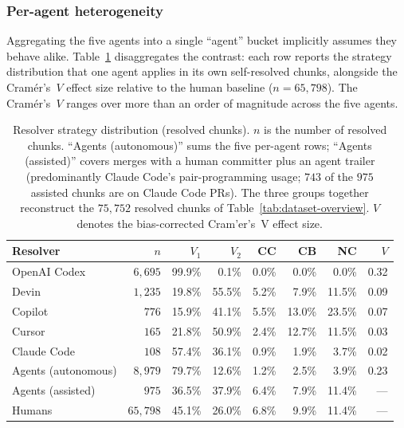 \documentclass[sigconf,anonymous]{acmart}
\begin{document}
\subsubsection{Per-agent heterogeneity}
\label{sec:rq2-heterogeneity}

Aggregating the five agents into a single ``agent'' bucket implicitly assumes they behave alike. Table~\ref{tab:per-agent-vs-human} disaggregates the contrast: each row reports the strategy distribution that one agent applies in its own self-resolved chunks, alongside the Cram\'{e}r's~$V$ effect size relative to the human baseline ($n=65{,}798$). The Cram\'{e}r's~$V$ ranges over more than an order of magnitude across the five agents.

\begin{table}
  \caption{Resolver strategy distribution (resolved chunks). $n$ is the number of resolved chunks. ``Agents (autonomous)'' sums the five per-agent rows; ``Agents (assisted)'' covers merges with a human committer plus an agent trailer (predominantly Claude Code's pair-programming usage; $743$ of the $975$ assisted chunks are on Claude Code PRs). The three groups together reconstruct the $75{,}752$ resolved chunks of Table~\ref{tab:dataset-overview}. $V$ denotes the bias-corrected Cram'{e}r's~V effect size.}
  \label{tab:per-agent-vs-human}
  \small\setlength{\tabcolsep}{3.5pt}
  \begin{tabular}{lrrrrrrr}
    \toprule
    Resolver & $n$ & $V_1$ & $V_2$ & CC & CB & NC & $V$ \\
    \midrule
    OpenAI Codex & $6{,}695$ & 99.9\% &  0.1\% &  0.0\% &  0.0\% &  0.0\% & 0.32 \\
    Devin        & $1{,}235$ & 19.8\% & 55.5\% &  5.2\% &  7.9\% & 11.5\% & 0.09 \\
    Copilot      & $776$     & 15.9\% & 41.1\% &  5.5\% & 13.0\% & 23.5\% & 0.07 \\
    Cursor       & $165$     & 21.8\% & 50.9\% &  2.4\% & 12.7\% & 11.5\% & 0.03 \\
    Claude Code  & $108$     & 57.4\% & 36.1\% &  0.9\% &  1.9\% &  3.7\% & 0.02 \\
    \midrule
    Agents (autonomous) & $8{,}979$ & 79.7\% & 12.6\% &  1.2\% &  2.5\% &  3.9\% & 0.23 \\
    Agents (assisted)   & $975$    & 36.5\% & 37.9\% &  6.4\% &  7.9\% & 11.4\% & --- \\
    \midrule
    Humans       & $65{,}798$ & 45.1\% & 26.0\% & 6.8\% & 9.9\% & 11.4\% & --- \\
    \bottomrule
  \end{tabular}
\end{table}
\end{document}
